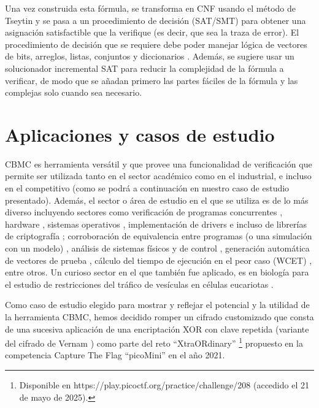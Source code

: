 \documentclass[runningheads]{llncs}
\begin{document}
Una vez construida esta fórmula, se transforma en CNF usando el método de Tseytin y se pasa a un procedimiento de decisión (SAT/SMT) para obtener una asignación satisfactible que la verifique (es decir, que sea la traza de error).
El procedimiento de decisión que se requiere debe poder manejar lógica de vectores de bits, arreglos, listas, conjuntos y diccionarios \cite{cbmc-slides}.
Además, se sugiere usar un solucionador incremental SAT para reducir la complejidad de la fórmula a verificar, de modo que se añadan primero las partes fáciles de la fórmula y las complejas solo cuando sea necesario.

\section{Aplicaciones y casos de estudio}
CBMC es herramienta versátil y que provee una funcionalidad de verificación que permite ser utilizada tanto en el sector académico como en el industrial, e incluso en el competitivo (como se podrá a continuación en nuestro caso de estudio presentado).
Además, el sector o área de estudio en el que se utiliza es de lo más diverso incluyendo sectores como verificación de programas concurrentes \cite{cbmc-concurrent}, hardware \cite{cbmc-hardware-case}, sistemas operativos \cite{cbmc-tinyos-case}, implementación de drivers \cite{cbmc-drivers-case} e incluso de librerías de criptografía \cite{cbmc-ecc-case,cbmc-prng-case}; corroboración de equivalencia entre programas (o una simulación con un modelo) \cite{cbmc-equiv-code-generators-case,cbmc-equiv-stateflow-case}, análisis de sistemas físicos y de control \cite{cbmc-vehicles-case}, generación automática de vectores de prueba \cite{cbmc-testing-case1,cbmc-testing-case2}, cálculo del tiempo de ejecución en el peor caso (WCET) \cite{cbmc-wcet-case}, entre otros.
Un curioso sector en el que también fue aplicado, es en biología para el estudio de restricciones del tráfico de vesículas en células eucariotas \cite{cbmc-biology-case}.

Como caso de estudio elegido para mostrar y reflejar el potencial y la utilidad de la herramienta CBMC, hemos decidido romper un cifrado customizado que consta de una sucesiva aplicación de una encriptación XOR con clave repetida (variante del cifrado de Vernam \cite{crypto-book}) como parte del reto ``XtraORdinary'' \footnote[3]{Disponible en https://play.picoctf.org/practice/challenge/208 (accedido el 21 de mayo de 2025).} propuesto en la competencia Capture The Flag ``picoMini'' en el año 2021.
\end{document}
